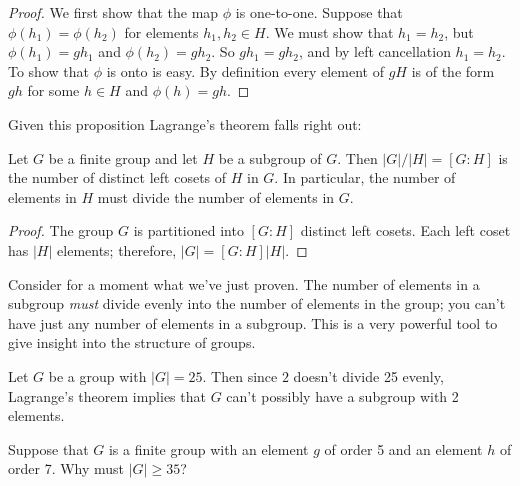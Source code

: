 \begin{proof}
We first show that the map $\phi$ is one-to-one.  Suppose that $\phi(h_1)  = \phi(h_2)$ for elements $h_1, h_2 \in H$.  We must show that $h_1 =  h_2$, but $\phi(h_1) = gh_1$ and $\phi(h_2) = gh_2$.  So $gh_1 = gh_2$,  and by left cancellation $h_1= h_2$.  To show that $\phi$ is onto is easy.  By definition every element of $gH$ is of the form $gh$ for some $h \in H$ and $\phi(h) = gh$. 
\end{proof}

Given this proposition Lagrange's theorem falls right out:

\begin{thm}\label{LagrangeTheorem}
Let $G$ be a finite group and let $H$ be a subgroup of $G$.  Then $|G|/|H| = [G : H]$ is the number of distinct left cosets of $H$ in $G$.  In particular, the number of elements in $H$ must divide the number of elements in $G$. 
\end{thm}

\begin{proof}
The group $G$ is partitioned into $[G : H]$ distinct left cosets.  Each left coset has $|H|$ elements; therefore, $|G| = [G : H] |H|$.
\end{proof}

Consider for a moment what we've just proven. The number of elements in a subgroup \emph{must} divide evenly into the number of elements in the group; you can't have just any number of elements in a subgroup. This is a very powerful tool to give insight into the structure of groups.

\begin{example}{}
Let $G$ be a group with $|G|=25$.  Then since $2$ doesn't divide 25 evenly, Lagrange's theorem implies that $G$ can't possibly have a subgroup with 2 elements.
\end{example}

\begin{exercise}{}
Suppose that $G$ is a finite group with an element $g$ of order 5 and an element $h$ of order 7. Why must $|G| \geq 35$?
\end{exercise} 

